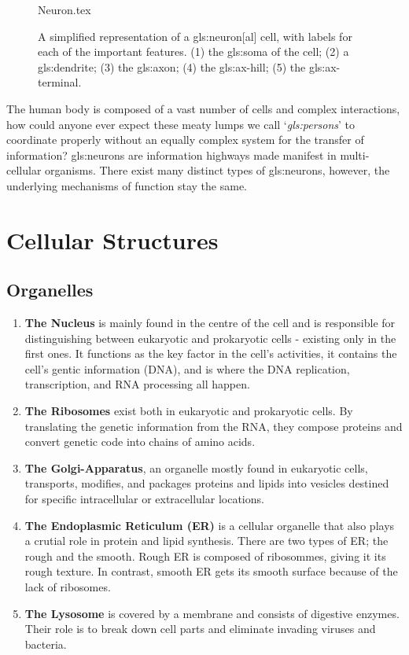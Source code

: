 \documentclass[class={myRUCProject}, crop=false]{standalone}
\begin{document}
\begin{figure}[H]
  \centering
  {Neuron.tex}
  \caption{A simplified representation of a \gls{gls:neuron}[al] cell, with labels for each of the important features. (1) the \gls{gls:soma} of the cell; (2) a \gls{gls:dendrite}; (3) the \gls{gls:axon}; (4) the \gls{gls:ax-hill}; (5) the \gls{gls:ax-terminal}.}\label{fig:Neuron}
\end{figure}

The human body is composed of a vast number of cells and complex interactions, how could anyone ever expect these meaty lumps we call `\textit{\glspl{gls:person}}' to coordinate properly without an equally complex system for the transfer of information? 
\Glspl{gls:neuron} are information highways made manifest in multi-cellular organisms. 
There exist many distinct types of \glspl{gls:neuron}, however, the underlying mechanisms of function stay the same.

\section{Cellular Structures}
\subsection{Organelles}
\begin{enumerate}

  \item \textbf{The Nucleus} is mainly found in the centre of the cell and is responsible for distinguishing between eukaryotic and prokaryotic cells - existing only in the first ones. It functions as the key factor in the cell's activities, it contains the cell's gentic information (DNA), and is where the DNA replication, transcription, and RNA processing all happen.
  \item \textbf{The Ribosomes} exist both in eukaryotic and prokaryotic cells. By translating the genetic information from the RNA, they compose proteins and convert genetic code into chains of amino acids.
  \item \textbf{The Golgi-Apparatus}, an organelle mostly found in eukaryotic cells, transports, modifies, and packages proteins and lipids into vesicles destined for specific intracellular or extracellular locations.
  \item \textbf{The Endoplasmic Reticulum (ER)} is a cellular organelle that also plays a crutial role in protein and lipid synthesis. There are two types of ER; the rough and the smooth. Rough ER is composed of ribosommes, giving it its rough texture. In contrast, smooth ER gets its smooth surface because of the lack of ribosomes.
  \item \textbf{The Lysosome} is covered by a membrane and consists of digestive enzymes. Their role is to break down cell parts and eliminate invading viruses and bacteria.
  
\end{enumerate}
\end{document}

